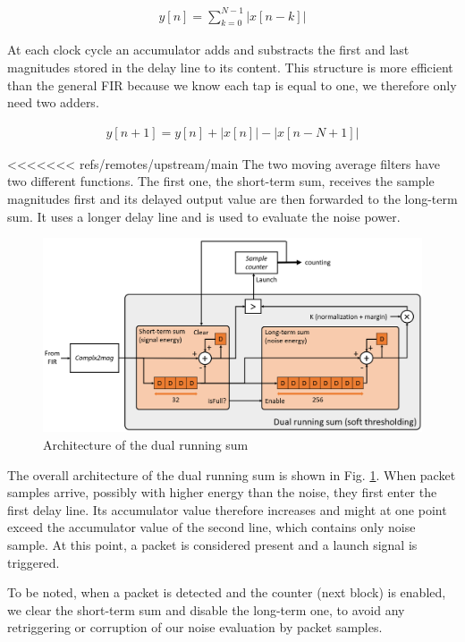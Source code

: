 \begin{enumerate}
\begin{enumerate}
    \begin{align}
            y[n] = \sum_{k=0}^{N-1}\left|x[n-k]\right|
    \end{align}

    At each clock cycle an accumulator adds and substracts the first and last magnitudes stored in the delay line to its content. This structure is more efficient than the general FIR because we know each tap is equal to one, we therefore only need two adders.

    \begin{align}
            y[n+1] = y[n] + \left|x[n]\right| - \left|x[n-N+1]\right|
    \end{align}

<<<<<<< refs/remotes/upstream/main
    The two moving average filters have two different functions. The first one, the short-term sum, receives the sample magnitudes first and its delayed output value are then forwarded to the long-term sum. It uses a longer delay line and is used to evaluate the noise power.

    \begin{figure}[h]
        \centering
        \includegraphics[width=\linewidth]{figures/dual_running_sum_block.png}
        \caption{Architecture of the dual running sum}
        \label{fig:dual_runnign_sum}
    \end{figure}

    The overall architecture of the dual running sum is shown in Fig. \ref{fig:dual_runnign_sum}. When packet samples arrive, possibly with  higher energy than the noise, they first enter the first delay line. Its accumulator value therefore increases and might at one point exceed the accumulator value of the second line, which contains only noise sample. At this point, a packet is considered present and a launch signal is triggered.

    To be noted, when a packet is detected and the counter (next block) is enabled, we clear the short-term sum and disable the long-term one, to avoid any retriggering or corruption of our noise evaluation by packet samples.



\end{enumerate}
\end{enumerate}
